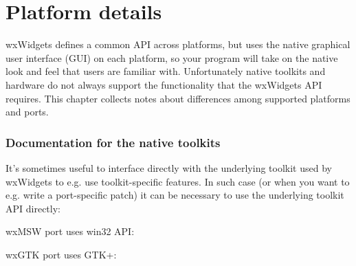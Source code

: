 \chapter{Platform details}\label{platformdetails}
%
\setfooter{\thepage}{}{}{}{}{\thepage}%

wxWidgets defines a common API across platforms, but uses the native graphical
user interface (GUI) on each platform, so your program will take on the native
look and feel that users are familiar with. Unfortunately native toolkits and
hardware do not always support the functionality that the wxWidgets API
requires. This chapter collects notes about differences among supported platforms and ports.









\subsection{Documentation for the native toolkits}\label{nativedocs}

It's sometimes useful to interface directly with the underlying toolkit
used by wxWidgets to e.g. use toolkit-specific features.
In such case (or when you want to e.g. write a port-specific patch) it can be
necessary to use the underlying toolkit API directly:

\begin{description}\itemsep=0pt
\item[{\bf wxMSW}]
wxMSW port uses win32 API: 

\item[{\bf wxGTK}]
wxGTK port uses GTK+: 

\end{description}